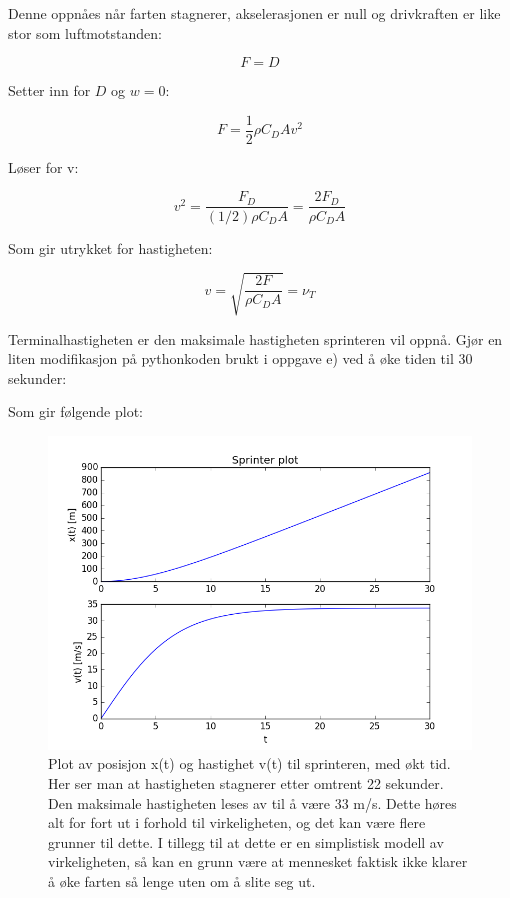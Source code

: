 \documentclass[a4paper,norsk,12pt]{article}
\begin{document}
\noindent
Denne oppnåes når farten stagnerer, akselerasjonen er null og drivkraften er like stor som luftmotstanden:

$$ F = D $$


Setter inn for $D$ og $w=0$:

$$ F = \dfrac{1}{2} \rho C_D A v^2 $$


Løser for v:

$$ v^2 = \dfrac{F_D}{(1/2) \rho C_D A} = \dfrac{2 F_D}{ \rho C_D A} $$ 


Som gir utrykket for hastigheten:

$$ v = \sqrt{\dfrac{2 F}{ \rho C_D A}} = \nu_T$$ 


\noindent
Terminalhastigheten er den maksimale hastigheten sprinteren vil oppnå. Gjør en liten modifikasjon på pythonkoden brukt i oppgave e) ved å øke tiden til 30 sekunder:




\noindent
Som gir følgende plot:

\begin{figure}[H]

  \includegraphics[width=\linewidth]{sprinter02.png}

  \caption{Plot av posisjon x(t) og hastighet v(t) til sprinteren, med økt tid. Her ser man at hastigheten stagnerer etter omtrent 22 sekunder. Den maksimale hastigheten leses av til å være 33 m/s. Dette høres alt for fort ut i forhold til virkeligheten, og det kan være flere grunner til dette. I tillegg til at dette er en simplistisk modell av virkeligheten, så kan en grunn  være at mennesket faktisk ikke klarer å øke farten så lenge uten om å slite seg ut.}

  \label{fig:plot4}
  
\end{figure}
\end{document}
